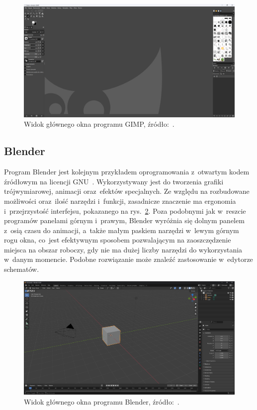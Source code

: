 \begin{figure}[h]
    \centering
    \includegraphics[width=.9\textwidth]{chapters/chapter2/img/gimp}
    \caption[Widok głównego okna programu GIMP.]{Widok głównego okna programu GIMP, źródło:~\cite{gimp_site}.}
    \label{fig:gimp_okno}
\end{figure}

\subsection{Blender}
\label{subsec:blender}

Program Blender jest kolejnym przykładem oprogramowania z~otwartym kodem źródłowym na licencji GNU~\cite{blender_site}.
Wykorzystywany jest do tworzenia grafiki trójwymiarowej, animacji oraz~efektów specjalnych.
Ze względu na rozbudowane możliwości oraz~ilość narzędzi i~funkcji,
zasadnicze znaczenie ma ergonomia i~przejrzystość interfejsu, pokazanego na rys.~\ref{fig:blender_okno}.
Poza podobnymi jak w~reszcie programów panelami górnym i~prawym,
Blender wyróżnia się dolnym panelem z~osią czasu do animacji, a~także małym paskiem narzędzi w~lewym górnym rogu okna,
co~jest efektywnym sposobem pozwalającym na zaoszczędzenie miejsca na obszar roboczy,
gdy nie ma dużej liczby narzędzi do wykorzystania w~danym momencie.
Podobne rozwiązanie może znaleźć zastosowanie w~edytorze schematów.

\begin{figure}[h]
    \centering
    \includegraphics[width=.9\textwidth]{chapters/chapter2/img/blender}
    \caption[Widok głównego okna programu Blender.]{Widok głównego okna programu Blender, źródło:~\cite{blender_site}.}
    \label{fig:blender_okno}
\end{figure}

